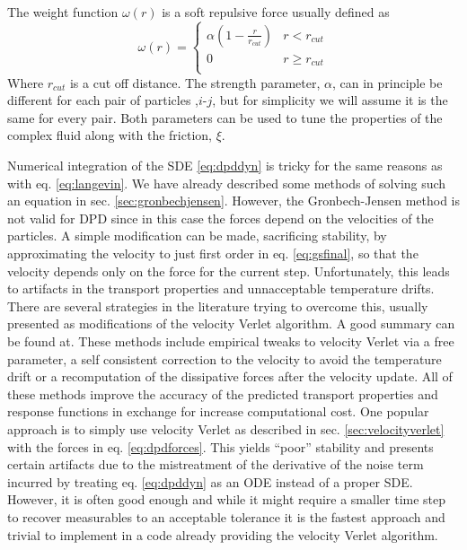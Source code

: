 \documentclass[ twoside,openright,titlepage,numbers=noenddot,%
headinclude,footinclude,cleardoublepage=empty,abstract=on,
BCOR=5mm,paper=a4,fontsize=11pt, dvipsnames
]{scrreprt}
\begin{document}
The weight function $\omega(r)$ is a soft repulsive force usually defined as
\begin{equation}
  \label{eq:dpdw}
  \omega(r) =
  \begin{cases}
    \alpha\left(1-\frac{r}{r_{cut}}\right) & r<r_{cut}\\
    0 & r\ge r_{cut}\\                                    
  \end{cases}
\end{equation}
Where $r_{cut}$ is a cut off distance. The strength parameter, $\alpha$, can in principle be different for each pair of particles ,$i$-$j$, but for simplicity we will assume it is the same for every pair. Both parameters can be used to tune the properties of the complex fluid along with the friction, $\xi$.

Numerical integration of the \gls{SDE} \eqref{eq:dpddyn} is tricky for the same reasons as with eq. \eqref{eq:langevin}. We have already described some methods of solving such an equation in sec. \ref{sec:gronbechjensen}. However, the Gronbech-Jensen method is not valid for \gls{DPD} since in this case the forces depend on the velocities of the particles. A simple modification can be made, sacrificing stability, by approximating the velocity to just first order in eq. \eqref{eq:gsfinal}, so that the velocity depends only on the force for the current step. Unfortunately, this leads to artifacts in the transport properties and unnacceptable temperature drifts. There are several strategies in the literature trying to overcome this, usually presented as modifications of the velocity Verlet algorithm. A good summary can be found at\cite{Leimhuler2015}. These methods include empirical tweaks to velocity Verlet via a free parameter\cite{Groot1997}, a self consistent correction to the velocity to avoid the temperature drift\cite{Pagonabarraga1998} or a recomputation of the dissipative forces after the velocity update\cite{Besold2000}.
All of these methods improve the accuracy of the predicted transport properties and response functions in exchange for increase computational cost. 
One popular approach is to simply use velocity Verlet as described in sec. \ref{sec:velocityverlet} with the forces in eq. \eqref{eq:dpdforces}. This yields ``poor'' stability and presents certain artifacts\cite{Besold2000} due to the mistreatment of the derivative of the noise term incurred by treating eq. \eqref{eq:dpddyn} as an \gls{ODE} instead of a proper \gls{SDE}. However, it is often good enough and while it might require a smaller time step to recover measurables to an acceptable tolerance it is the fastest approach and trivial to implement in a code already providing the velocity Verlet algorithm.
\end{document}
